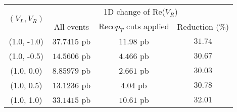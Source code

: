 \begin{table}[h!]
 \centering
 \begin{tabular}{|c|c|c|c|}
  \hline
  \multirow{2}{*}{$(V_L,V_R)$} 	& \multicolumn{3}{|c|}{1D change of Re($V_R$)}  			\\
					& All events	& Reco$p_T$ cuts applied	& Reduction ($\%$) 	\\
  \hline
    (1.0, -1.0)				& $37.7415$ pb	& $11.98$ pb			& $31.74$		\\
    (1.0, -0.5)				& $14.5606$ pb	& $4.466$ pb			& $30.67$		\\
    (1.0,  0.0)				& $8.85979$ pb	& $2.661$ pb			& $30.03$		\\
    (1.0,  0.5)				& $13.1236$ pb	& $4.04$ pb			& $30.78$		\\
    (1.0,  1.0)				& $33.1415$ pb	& $10.61$ pb			& $32.01$		\\
  \hline 
 \end{tabular} 
 \caption{} \label{table::XSChangeAccVR}
\end{table}

